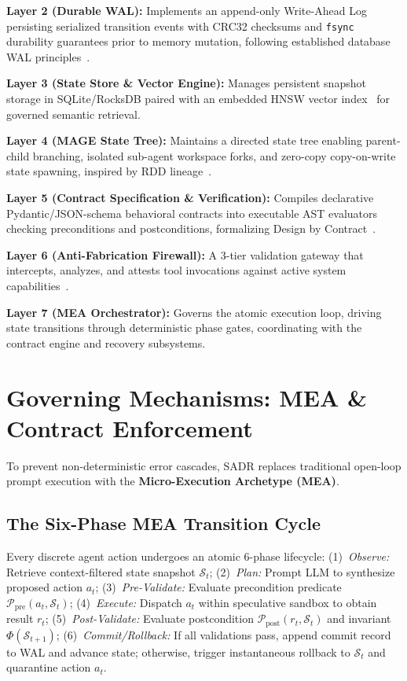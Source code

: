 \documentclass[10pt,journal,compsoc]{IEEEtran}
\begin{document}
\textbf{Layer 2 (Durable WAL):} Implements an append-only Write-Ahead Log persisting serialized transition events with CRC32 checksums and \texttt{fsync} durability guarantees prior to memory mutation, following established database WAL principles~\cite{gray1981transaction, kleppmann2017designing}.

\textbf{Layer 3 (State Store \& Vector Engine):} Manages persistent snapshot storage in SQLite/RocksDB paired with an embedded HNSW vector index~\cite{malkov2020hnsw} for governed semantic retrieval.

\textbf{Layer 4 (MAGE State Tree):} Maintains a directed state tree enabling parent-child branching, isolated sub-agent workspace forks, and zero-copy copy-on-write state spawning, inspired by RDD lineage~\cite{zaharia2012rdd}.

\textbf{Layer 5 (Contract Specification \& Verification):} Compiles declarative Pydantic/JSON-schema behavioral contracts into executable AST evaluators checking preconditions and postconditions, formalizing Design by Contract~\cite{meyer1992design}.

\textbf{Layer 6 (Anti-Fabrication Firewall):} A 3-tier validation gateway that intercepts, analyzes, and attests tool invocations against active system capabilities~\cite{deng2026autopilot}.

\textbf{Layer 7 (MEA Orchestrator):} Governs the atomic execution loop, driving state transitions through deterministic phase gates, coordinating with the contract engine and recovery subsystems.


\section{Governing Mechanisms: MEA \& Contract Enforcement}
To prevent non-deterministic error cascades, SADR replaces traditional open-loop prompt execution with the \textbf{Micro-Execution Archetype (MEA)}.

\subsection{The Six-Phase MEA Transition Cycle}
Every discrete agent action undergoes an atomic 6-phase lifecycle: (1)~\emph{Observe:} Retrieve context-filtered state snapshot $\mathcal{S}_t$; (2)~\emph{Plan:} Prompt LLM to synthesize proposed action $a_t$; (3)~\emph{Pre-Validate:} Evaluate precondition predicate $\mathcal{P}_{\text{pre}}(a_t, \mathcal{S}_t)$; (4)~\emph{Execute:} Dispatch $a_t$ within speculative sandbox to obtain result $r_t$; (5)~\emph{Post-Validate:} Evaluate postcondition $\mathcal{P}_{\text{post}}(r_t, \mathcal{S}_t)$ and invariant $\Phi(\mathcal{S}_{t+1})$; (6)~\emph{Commit/Rollback:} If all validations pass, append commit record to WAL and advance state; otherwise, trigger instantaneous rollback to $\mathcal{S}_t$ and quarantine action $a_t$.
\end{document}
